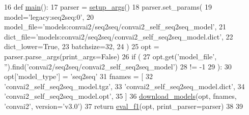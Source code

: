 \begin{DoxyCode}
16 \textcolor{keyword}{def }\hyperlink{namespaceseq2seq_1_1eval__f1_a99ede4f55975fd62d1d5834b72fa03c7}{main}():
17     parser = \hyperlink{namespaceprojects_1_1convai2_1_1eval__f1_a74826f78ce1ce6c9fe9b6d4a6297f3bd}{setup\_args}()
18     parser.set\_params(
19         model=\textcolor{stringliteral}{'legacy:seq2seq:0'},
20         model\_file=\textcolor{stringliteral}{'models:convai2/seq2seq/convai2\_self\_seq2seq\_model'},
21         dict\_file=\textcolor{stringliteral}{'models:convai2/seq2seq/convai2\_self\_seq2seq\_model.dict'},
22         dict\_lower=\textcolor{keyword}{True},
23         batchsize=32,
24     )
25     opt = parser.parse\_args(print\_args=\textcolor{keyword}{False})
26     \textcolor{keywordflow}{if} (
27         opt.get(\textcolor{stringliteral}{'model\_file'}, \textcolor{stringliteral}{''}).find(\textcolor{stringliteral}{'convai2/seq2seq/convai2\_self\_seq2seq\_model'})
28         != -1
29     ):
30         opt[\textcolor{stringliteral}{'model\_type'}] = \textcolor{stringliteral}{'seq2seq'}
31         fnames = [
32             \textcolor{stringliteral}{'convai2\_self\_seq2seq\_model.tgz'},
33             \textcolor{stringliteral}{'convai2\_self\_seq2seq\_model.dict'},
34             \textcolor{stringliteral}{'convai2\_self\_seq2seq\_model.opt'},
35         ]
36         \hyperlink{namespaceparlai_1_1core_1_1build__data_ab697f23f05d3e36d7979fe5e0ed7911e}{download\_models}(opt, fnames, \textcolor{stringliteral}{'convai2'}, version=\textcolor{stringliteral}{'v3.0'})
37     \textcolor{keywordflow}{return} \hyperlink{namespaceprojects_1_1convai2_1_1eval__f1_aac16a2ead8ff2b896c82411fe262f449}{eval\_f1}(opt, print\_parser=parser)
38 
39 
\end{DoxyCode}
